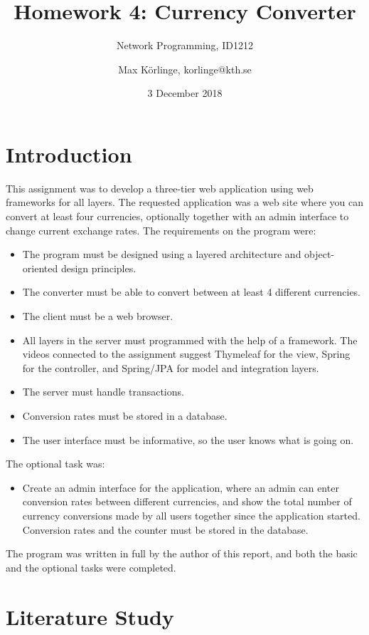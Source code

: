 \documentclass[a4paper]{scrartcl}
\title{Homework 4: Currency Converter}
\subtitle{Network Programming, ID1212}
\author{Max Körlinge, korlinge@kth.se}
\date{3 December 2018}
\begin{document}
\maketitle


\section{Introduction}

\noindent This assignment was to develop a three-tier web application using web frameworks for all layers. The requested application was a web site where you can convert at least four currencies, optionally together with an admin interface to change current exchange rates. The requirements on the program were:

\begin{itemize}
    \item The program must be designed using a layered architecture and object-oriented design principles.
    \item The converter must be able to convert between at least 4 different currencies.
    \item The client must be a web browser.
    \item All layers in the server must programmed with the help of a framework. The videos connected to the assignment suggest Thymeleaf for the view, Spring for the controller, and Spring/JPA for model and integration layers.
    \item The server must handle transactions.
    \item Conversion rates must be stored in a database.
    \item The user interface must be informative, so the user knows what is going on.
\end{itemize}

The optional task was:

\begin{itemize}
    \item Create an admin interface for the application, where an admin can enter conversion rates between different currencies, and show the total number of currency conversions made by all users together since the application started. Conversion rates and the counter must be stored in the database.
\end{itemize}

The program was written in full by the author of this report, and both the basic and the optional tasks were completed.

\section{Literature Study}
\end{document}
